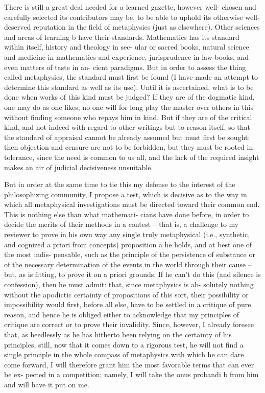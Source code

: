 There is still a great deal needed for a learned gazette, however well-
chosen and carefully selected its contributors may be, to be able to uphold
its otherwise well-deserved reputation in the ﬁeld of metaphysics (just as
elsewhere). Other sciences and areas of learning b have their standards.
Mathematics has its standard within itself, history and theology in sec-
ular or sacred books, natural science and medicine in mathematics and
experience, jurisprudence in law books, and even matters of taste in an-
cient paradigms. But in order to assess the thing called metaphysics, the
standard must ﬁrst be found (I have made an attempt to determine this
standard as well as its use). Until it is ascertained, what is to be done
when works of this kind must be judged? If they are of the dogmatic
kind, one may do as one likes; no one will for long play the master over
others in this without ﬁnding someone who repays him in kind. But if
they are of the critical kind, and not indeed with regard to other writings
but to reason itself, so that the standard of appraisal cannot be already
assumed but must ﬁrst be sought: then objection and censure are not
to be forbidden, but they must be rooted in tolerance, since the need is
common to us all, and the lack of the required insight makes an air of
judicial decisiveness unsuitable.

But in order at the same time to tie this my defense to the interest
of the philosophizing community, I propose a test, which is decisive as
to the way in which all metaphysical investigations must be directed
toward their common end. This is nothing else than what mathemati-
cians have done before, in order to decide the merits of their methods
in a contest – that is, a challenge to my reviewer to prove in his own
way any single truly metaphysical (i.e., synthetic, and cognized a priori
from concepts) proposition a he holds, and at best one of the most indis-
pensable, such as the principle of the persistence of substance or of the
necessary determination of the events in the world through their cause
– but, as is ﬁtting, to prove it on a priori grounds. If he can’t do this (and
silence is confession), then he must admit: that, since metaphysics is ab-
solutely nothing without the apodictic certainty of propositions of this
sort, their possibility or impossibility would ﬁrst, before all else, have to
be settled in a critique of pure reason, and hence he is obliged either to
acknowledge that my principles of critique are correct or to prove their
invalidity. Since, however, I already foresee that, as heedlessly as he has
hitherto been relying on the certainty of his principles, still, now that it
comes down to a rigorous test, he will not ﬁnd a single principle in the
whole compass of metaphysics with which he can dare come forward, I
will therefore grant him the most favorable terms that can ever be ex-
pected in a competition; namely, I will take the onus probandi b from him
and will have it put on me.

